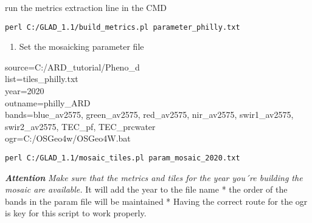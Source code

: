 \documentclass[]{article}
\providecommand{\tightlist}{%
  \setlength{\itemsep}{0pt}\setlength{\parskip}{0pt}}
\begin{document}
run the metrics extraction line in the CMD

\begin{verbatim}
perl C:/GLAD_1.1/build_metrics.pl parameter_philly.txt
\end{verbatim}

\begin{enumerate}
\def\labelenumi{\arabic{enumi}.}
\setcounter{enumi}{1}
\tightlist
\item
  Set the mosaicking parameter file
\end{enumerate}

source=C:/ARD\_tutorial/Pheno\_d\\
list=tiles\_philly.txt\\
year=2020\\
outname=philly\_ARD\\
bands=blue\_av2575, green\_av2575, red\_av2575, nir\_av2575,
swir1\_av2575, swir2\_av2575, TEC\_pf, TEC\_prcwater\\
ogr=C:/OSGeo4w/OSGeo4W.bat

\begin{verbatim}
perl C:/GLAD_1.1/mosaic_tiles.pl param_mosaic_2020.txt
\end{verbatim}

\textbf{\emph{Attention}} \emph{Make sure that the metrics and tiles for
the year you´re building the mosaic are available. }It will add the year
to the file name * the order of the bands in the param file will be
maintained * Having the correct route for the ogr is key for this script
to work properly.
\end{document}
